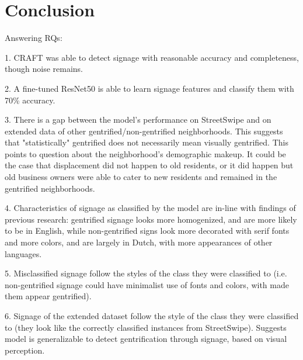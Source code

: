\section{Conclusion}
\label{sec:conclusion}

Answering RQs:

1. CRAFT was able to detect signage with reasonable accuracy and completeness, though noise remains.

2. A fine-tuned ResNet50 is able to learn signage features and classify them with 70\% accuracy.

3. There is a gap between the model's performance on StreetSwipe and on extended data of other gentrified/non-gentrified neighborhoods. This suggests that "statistically" gentrified does not necessarily mean visually gentrified. This points to question about the neighborhood's demographic makeup. It could be the case that displacement did not happen to old residents, or it did happen but old business owners were able to cater to new residents and remained in the gentrified neighborhoods.

4. Characteristics of signage as classified by the model are in-line with findings of previous research: gentrified signage looks more homogenized, and are more likely to be in English, while non-gentrified signs look more decorated with serif fonts and more colors, and are largely in Dutch, with more appearances of other languages.

5. Misclassified signage follow the styles of the class they were classified to (i.e. non-gentrified signage could have minimalist use of fonts and colors, with made them appear gentrified). 

6. Signage of the extended dataset follow the style of the class they were classified to (they look like the correctly classified instances from StreetSwipe). Suggests model is generalizable to detect gentrification through signage, based on visual perception.